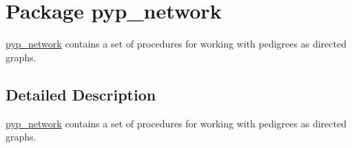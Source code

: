\hypertarget{namespacepyp__network}{
\section{Package pyp\_\-network}
\label{namespacepyp__network}
}


\hyperlink{namespacepyp__network}{pyp\_\-network} contains a set of procedures for working with pedigrees as directed graphs.  




\subsection{Detailed Description}
\hyperlink{namespacepyp__network}{pyp\_\-network} contains a set of procedures for working with pedigrees as directed graphs. 